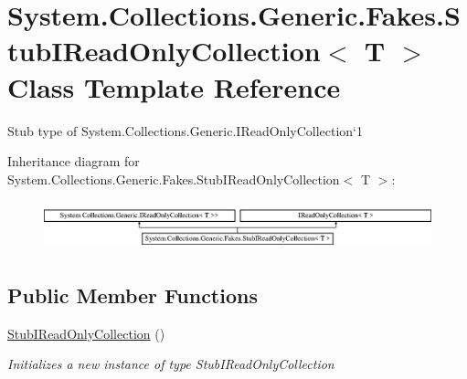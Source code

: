 \hypertarget{class_system_1_1_collections_1_1_generic_1_1_fakes_1_1_stub_i_read_only_collection_3_01_t_01_4}{\section{System.\-Collections.\-Generic.\-Fakes.\-Stub\-I\-Read\-Only\-Collection$<$ T $>$ Class Template Reference}
\label{class_system_1_1_collections_1_1_generic_1_1_fakes_1_1_stub_i_read_only_collection_3_01_t_01_4}
}


Stub type of System.\-Collections.\-Generic.\-I\-Read\-Only\-Collection`1 


Inheritance diagram for System.\-Collections.\-Generic.\-Fakes.\-Stub\-I\-Read\-Only\-Collection$<$ T $>$\-:\begin{figure}[H]
\begin{center}
\leavevmode
\includegraphics[height=1.443299cm]{class_system_1_1_collections_1_1_generic_1_1_fakes_1_1_stub_i_read_only_collection_3_01_t_01_4}
\end{center}
\end{figure}
\subsection*{Public Member Functions}
\begin{DoxyCompactItemize}
\item 
\hyperlink{class_system_1_1_collections_1_1_generic_1_1_fakes_1_1_stub_i_read_only_collection_3_01_t_01_4_aa159e9555800627a1a2ca24921ea46d2}{Stub\-I\-Read\-Only\-Collection} ()
\begin{DoxyCompactList}\small\item\em Initializes a new instance of type Stub\-I\-Read\-Only\-Collection\end{DoxyCompactList}\end{DoxyCompactItemize}
